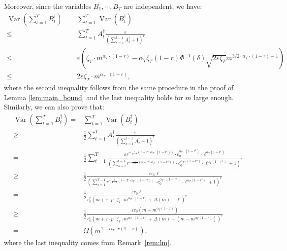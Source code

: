 \documentclass[blindrev]{informs3noheader}
\DeclareMathOperator{\Var}{Var}
\begin{document}
Moreover, since the variables $B_1,\cdots,B_T$ are independent, we have:
\begin{align*}
\Var\left(\sum_{t=1}^T B^\dagger_t\right)
=&\sum_{t=1}^T \Var(B^\dagger_t)\\
\leq&\sum_{t=1}^T A^\dagger_t \frac{\varepsilon}{\left(\sum_{s=1}^{t-1} A^\dagger_s +1\right)^r}
\\
\leq & \varepsilon\left(\zeta_T \cdot m^{\alpha_T \cdot (1-r)} -  \alpha_T\zeta_T(1-r) \Phi^{-1}(\delta) \sqrt{2\varepsilon \zeta_T} m^{3/2 \cdot \alpha_T \cdot (1-r)-1}\right)\\
\leq & 2\varepsilon\zeta_T \cdot m^{\alpha_T \cdot (1-r)},
\end{align*}
where the second inequality follows from the same procedure in the proof of Lemma \ref{lem:main_bound} and the last inequality holds for $m$ large enough. Similarly, we can also prove that:
\begin{align*}
\Var\left(\sum_{t=1}^T B^\dagger_t\right)
= &\sum_{t=1}^T \Var(B^\dagger_t)\\
\geq&\frac{1}{2}\sum_{t=1}^T A^\dagger_t \frac{\varepsilon}{\left(\sum_{s=1}^{t-1} A^\dagger_s +1\right)^r}
\\
= &\frac{1}{2}\sum_{t=1}^T   \frac{\varepsilon r^{-\frac{1}{1-r}\left(t-T\cdot\alpha_T\cdot(1-r^t)\right)}\cdot c_0^{\alpha_T\cdot(1-r^t)}\cdot \ell^{\alpha_T(1-r^t)}}{\left(\sum_{s=1}^{t-1} r^{-\frac{1}{1-r}\left(s-T\cdot\alpha_T\cdot(1-r^s)\right)}\cdot c_0^{\alpha_T\cdot(1-r^s)}\cdot \ell^{\alpha_T(1-r^s)}  +1\right)^r}\\
\geq & \frac{1}{2}   \frac{\varepsilon c_0 \ell}{\left(\sum_{s=1}^{T-1} r^{-\frac{1}{1-r}\left(s-T\cdot\alpha_T\cdot(1-r^s)\right)}\cdot c_0^{\alpha_T\cdot(1-r^s)}\cdot \ell^{\alpha_T(1-r^s)}  +1\right)^r}\\
=& \frac{1}{2}   \frac{\varepsilon c_0 \ell}{c_0^r\left(m+\varepsilon\cdot p \cdot \zeta_T \cdot m^{\alpha_T \cdot(1-r)}+\Delta(m)-\ell\right)^r}\\
\geq& \frac{1}{2}   \frac{\varepsilon c_0 \left(m-m^{\alpha_T(1-r)}\right)}{c_0^r\left(m+\varepsilon\cdot p \cdot \zeta_T \cdot m^{\alpha_T \cdot(1-r)}+\Delta(m)-\left(m-m^{\alpha_T(1-r)}\right)\right)^r}\\
=& \Omega(m^{1-\alpha_T \cdot r(1-r)}),
\end{align*}
where the last inequality comes from Remark~\ref{rem:lm}.
\end{document}

